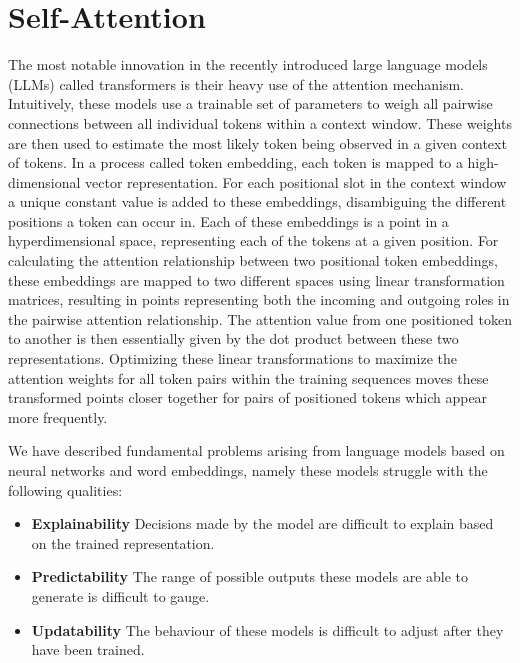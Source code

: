 \section{Self-Attention}
The most notable innovation in the recently introduced large language models (LLMs) called transformers is their heavy use of the attention mechanism. Intuitively, these models use a trainable set of parameters to weigh all pairwise connections between all individual tokens within a context window. These weights are then used to estimate the most likely token being observed in a given context of tokens.
In a process called token embedding, each token is mapped to a high-dimensional vector representation. For each positional slot in the context window a unique constant value is added to these embeddings, disambiguing the different positions a token can occur in.
Each of these embeddings is a point in a hyperdimensional space, representing each of the tokens at a given position.
For calculating the attention relationship between two positional token embeddings, these embeddings are mapped to two different spaces using linear transformation matrices, resulting in points representing both the incoming and outgoing roles in the pairwise attention relationship. The attention value from one positioned token to another is then essentially given by the dot product between these two representations.
Optimizing these linear transformations to maximize the attention weights for all token pairs within the training sequences moves these transformed points closer together for pairs of positioned tokens which appear more frequently.

We have described fundamental problems arising from language models based on neural networks and word embeddings, namely these models struggle with the following qualities:

\begin{itemize}
\item \textbf{Explainability}
Decisions made by the model are difficult to explain based on the trained representation.
\item \textbf{Predictability}
The range of possible outputs these models are able to generate is difficult to gauge.
\item \textbf{Updatability}
The behaviour of these models is difficult to adjust after they have been trained.
\end{itemize}